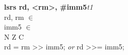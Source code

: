 


\begin{instructionblock}{\imagewidth}%
    \textbf{lsrs rd, <rm>, \#imm5}\hfill\textit{t1}\\
    rd, rm $\in$ \baseregisters\\
    imm5 $\in$ \immFive\\
    {N Z C}\\
    rd = rm {>}{>} imm5; \textit{or} rd {>}{>}= imm5;
\end{instructionblock}

